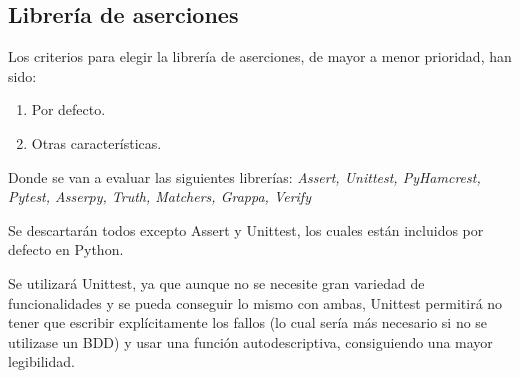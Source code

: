 \subsection{Librería de aserciones}
Los criterios para elegir la librería de aserciones, de mayor a menor prioridad, han sido:

\begin{enumerate}
    \item Por defecto.
    \item Otras características.
\end{enumerate}

Donde se van a evaluar las siguientes librerías: \textit{Assert, Unittest, PyHamcrest, Pytest, Asserpy, Truth, Matchers, Grappa, Verify}

Se descartarán todos excepto Assert y Unittest, los cuales están incluidos por defecto en Python.

Se utilizará Unittest, ya que aunque no se necesite gran variedad de funcionalidades y se pueda conseguir lo mismo con ambas, Unittest permitirá no tener que escribir explícitamente los fallos (lo cual sería más necesario si no se utilizase un BDD) y usar una función autodescriptiva, consiguiendo una mayor legibilidad.